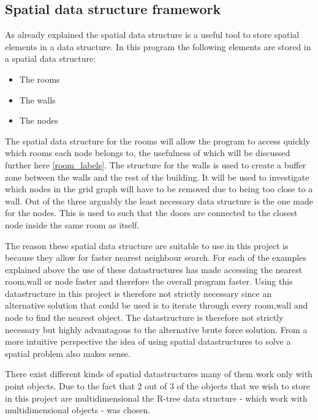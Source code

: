 

\subsection{Spatial data structure framework}
As already explained the spatial data structure is a useful tool to store spatial elements in a data structure. In this program the following elements are stored in a spatial data structure:
\begin{itemize}
    \item The rooms
    \item The walls
    \item The nodes
\end{itemize}
The spatial data structure for the rooms will allow the program to access quickly which rooms each node belongs to, the usefulness of which will be discussed further here \ref{room_labels}.
The structure for the walls is used to create a buffer zone between the walls and the rest of the building. It will be used to investigate which nodes in the grid graph will have to be removed due to being too close to a wall.
Out of the three arguably the least necessary data structure is the one made for the nodes. This is used to such that the doors are connected to the closest node inside the same room as itself. 

The reason these spatial data structure are suitable to use in this project is because they allow for faster nearest neighbour search. For each of the examples explained above the use of these datastructures has made accessing the nearest room,wall or node faster and therefore the overall program faster.
Using this datastructure in this project is therefore not strictly necessary since an alternative solution that could be used is to iterate through every room,wall and node to find the nearest object. The datastructure is therefore not strictly necessary but highly advantagous to the alternative brute force solution. From a more intuitive perspective the idea of using spatial datastructures to solve a spatial problem also makes sense.  

There exist different kinds of spatial datastructures many of them work only with point objects. Due to the fact that 2 out of 3 of the objects that we wish to store in this project are multidimensional the R-tree data structure - which work with multidimensional objects - was chosen.

